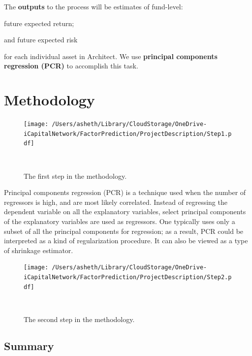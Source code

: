 \documentclass{ledger}
\begin{document}
The \textbf{outputs} to the process will be estimates of fund-level:
\begin{inparaenum}[$\bullet$]
	\item  future expected return;
	\item  and future expected risk
\end{inparaenum}
for each individual asset in Architect. We use \textbf{principal components regression (PCR)} to accomplish this task. 

\section{Methodology}
\begin{figure}[!ht]
\centering
	\texttt{[image: /Users/asheth/Library/CloudStorage/OneDrive-iCapitalNetwork/FactorPrediction/ProjectDescription/Step1.pdf]}
	\caption{The first step in the methodology.} ~\\
\end{figure}

Principal components regression (PCR) is a technique used when the number of regressors is high, and are most likely correlated. Instead of regressing the dependent variable on all the explanatory variables, select principal components of the explanatory variables are used as regressors. One typically uses only a subset of all the principal components for regression; as a result, PCR could be interpreted as a kind of regularization procedure. It can also be viewed as a type of shrinkage estimator. \\

\begin{figure}[!ht]
\centering
	\texttt{[image: /Users/asheth/Library/CloudStorage/OneDrive-iCapitalNetwork/FactorPrediction/ProjectDescription/Step2.pdf]}
	\caption{The second step in the methodology.} ~\\
\end{figure}

\subsection{Summary}
\end{document}
